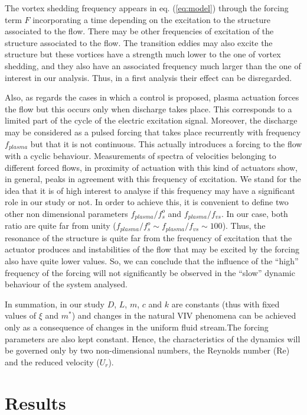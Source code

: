 \documentclass[review]{elsarticle}
\begin{document}
The vortex shedding frequency appears in eq. (\ref{eq:model}) through the forcing term $F$ incorporating a time depending on the excitation to the structure associated to the flow. There may be other frequencies of excitation of the structure associated to the flow. The transition eddies may also excite the structure but these vortices have a strength much lower to the one of vortex shedding, and they also have an associated frequency much larger than the one of interest in our analysis. Thus, in a first analysis their effect can be disregarded.

Also, as regards the cases in which a control is proposed, plasma actuation forces the flow but this occurs only when discharge takes place. This corresponds to a limited part of the cycle of the electric excitation signal. Moreover, the discharge may be considered as a pulsed forcing that takes place recurrently with frequency $f_{plasma}$ but that it is not continuous. This actually introduces a forcing to the flow with a cyclic behaviour. Measurements of spectra of velocities belonging to different forced flows, in proximity of actuation with this kind of actuators show, in general, peaks in agreement with this frequency of excitation. We stand for the idea that it is of high interest to analyse if this frequency may have a significant role in our study or not. In order to achieve this, it is convenient to define two other non dimensional parameters $f_{plasma}/f_s^o $ and $f_{plasma}/f_{vs}$. In our case, both ratio are quite far from unity ($f_{plasma}/f_s^o \sim f_{plasma}/f_{vs} \sim 100$). Thus, the resonance of the structure is quite far from the frequency of excitation that the actuator produces and instabilities of the flow that may be excited by the forcing also have quite lower values. So, we can conclude that the influence of the ``high'' frequency of the forcing will not significantly be observed in the ``slow'' dynamic behaviour of the system analysed.

In summation, in our study $D$, $L$, $m$, $c$ and $k$ are constants (thus with fixed values of $\xi$ and  $m^*$) and changes in the natural VIV phenomena can be achieved only as a consequence of changes in the uniform fluid stream.The forcing parameters are also kept constant. Hence, the characteristics of the dynamics  will be governed only by two non-dimensional numbers, the Reynolds number ($\text{Re}$) and the reduced velocity ($U_r$). 

\section{Results}
\label{sec:Res}
\end{document}
